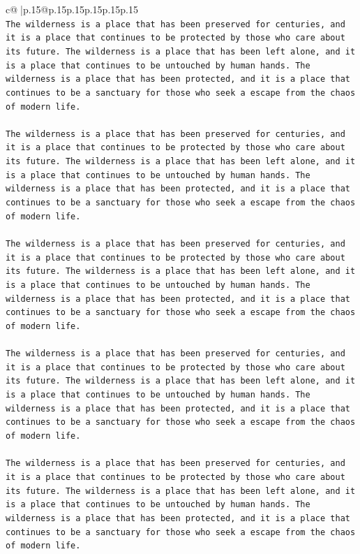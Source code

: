 \documentclass{article}
\begin{document}
{\begin{supertabular}{c@{$\;$}|p{.15\linewidth}@{}p{.15\linewidth}p{.15\linewidth}p{.15\linewidth}p{.15\linewidth}p{.15\linewidth}}
{{{\\ 
\texttt{The wilderness is a place that has been preserved for centuries, and it is a place that continues to be protected by those who care about its future. The wilderness is a place that has been left alone, and it is a place that continues to be untouched by human hands. The wilderness is a place that has been protected, and it is a place that continues to be a sanctuary for those who seek a escape from the chaos of modern life.} \\
\\ 
\texttt{The wilderness is a place that has been preserved for centuries, and it is a place that continues to be protected by those who care about its future. The wilderness is a place that has been left alone, and it is a place that continues to be untouched by human hands. The wilderness is a place that has been protected, and it is a place that continues to be a sanctuary for those who seek a escape from the chaos of modern life.} \\
\\ 
\texttt{The wilderness is a place that has been preserved for centuries, and it is a place that continues to be protected by those who care about its future. The wilderness is a place that has been left alone, and it is a place that continues to be untouched by human hands. The wilderness is a place that has been protected, and it is a place that continues to be a sanctuary for those who seek a escape from the chaos of modern life.} \\
\\ 
\texttt{The wilderness is a place that has been preserved for centuries, and it is a place that continues to be protected by those who care about its future. The wilderness is a place that has been left alone, and it is a place that continues to be untouched by human hands. The wilderness is a place that has been protected, and it is a place that continues to be a sanctuary for those who seek a escape from the chaos of modern life.} \\
\\ 
\texttt{The wilderness is a place that has been preserved for centuries, and it is a place that continues to be protected by those who care about its future. The wilderness is a place that has been left alone, and it is a place that continues to be untouched by human hands. The wilderness is a place that has been protected, and it is a place that continues to be a sanctuary for those who seek a escape from the chaos of modern life.} \\
}}}
\end{supertabular}}
\end{document}
